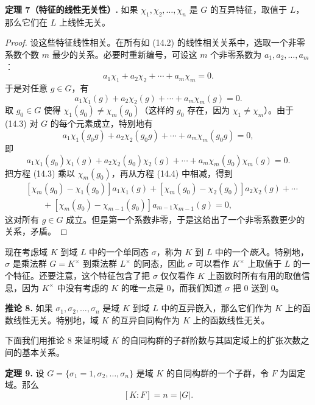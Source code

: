 \noindent\textbf{定理 7（特征的线性无关性）.} 如果 $\chi_1,\chi_2,\ldots,\chi_n$ 是 $G$ 的互异特征，取值于 $L$，那么它们在 $L$ 上线性无关。

\begin{proof}
设这些特征线性相关。在所有如 (14.2) 的线性相关关系中，选取一个非零系数个数 $m$ 最少的关系。必要时重新编号，可设这 $m$ 个非零系数为 $a_1,a_2,\ldots,a_m$：
\[
 a_1\chi_1+a_2\chi_2+\cdots+a_m\chi_m=0.
\]
于是对任意 $g\in G$，有
\begin{equation}
 a_1\chi_1(g)+a_2\chi_2(g)+\cdots+a_m\chi_m(g)=0.
\tag{14.3}
\end{equation}
取 $g_0\in G$ 使得 $\chi_1(g_0)\neq\chi_m(g_0)$（这样的 $g_0$ 存在，因为 $\chi_1\neq\chi_m$）。由于 (14.3) 对 $G$ 的每个元素成立，特别地有
\[
 a_1\chi_1(g_0g)+a_2\chi_2(g_0g)+\cdots+a_m\chi_m(g_0g)=0,
\]
即
\begin{equation}
 a_1\chi_1(g_0)\chi_1(g)+a_2\chi_2(g_0)\chi_2(g)+\cdots+a_m\chi_m(g_0)\chi_m(g)=0.
\tag{14.4}
\end{equation}
把方程 (14.3) 乘以 $\chi_m(g_0)$，再从方程 (14.4) 中相减，得到
\[
\begin{aligned}
&[\chi_m(g_0)-\chi_1(g_0)]a_1\chi_1(g)+[\chi_m(g_0)-\chi_2(g_0)]a_2\chi_2(g)+\cdots\\
&\qquad +[\chi_m(g_0)-\chi_{m-1}(g_0)]a_{m-1}\chi_{m-1}(g)=0,
\end{aligned}
\]
这对所有 $g\in G$ 成立。但是第一个系数非零，于是这给出了一个非零系数更少的关系，矛盾。
\end{proof}

现在考虑域 $K$ 到域 $L$ 中的一个单同态 $\sigma$，称为 $K$ 到 $L$ 中的一个\emph{嵌入}。特别地，$\sigma$ 是乘法群 $G=K^\times$ 到乘法群 $L^\times$ 的同态，因此 $\sigma$ 可以看作 $K^\times$ 上取值于 $L$ 的一个特征。还要注意，这个特征包含了把 $\sigma$ 仅仅看作 $K$ 上函数时所有有用的取值信息，因为 $K^\times$ 中没有考虑的 $K$ 的唯一点是 $0$，而我们知道 $\sigma$ 把 $0$ 送到 $0$。

\noindent\textbf{推论 8.} 如果 $\sigma_1,\sigma_2,\ldots,\sigma_n$ 是域 $K$ 到域 $L$ 中的互异嵌入，那么它们作为 $K$ 上的函数线性无关。特别地，域 $K$ 的互异自同构作为 $K$ 上的函数线性无关。

下面我们用推论 8 来证明域 $K$ 的自同构群的子群阶数与其固定域上的扩张次数之间的基本关系。

\noindent\textbf{定理 9.} 设 $G=\{\sigma_1=1,\sigma_2,\ldots,\sigma_n\}$ 是域 $K$ 的自同构群的一个子群，令 $F$ 为固定域。那么
\[
[K:F]=n=|G|.
\]

